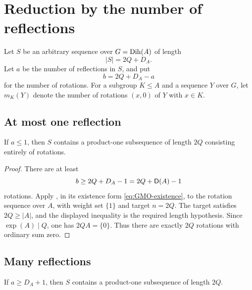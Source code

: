 \section{Reduction by the number of reflections}\label{sec:reflection-count}

Let \(S\) be an arbitrary sequence over \(G=\operatorname{Dih}(A)\) of length
\begin{equation}\label{eq:ambient-length}
  |S|=2Q+D_A.
\end{equation}
Let \(a\) be the number of reflections in \(S\), and put
\[
  b=2Q+D_A-a
\]
for the number of rotations. For a subgroup \(K\le A\) and a sequence
\(Y\) over \(G\), let \(m_K(Y)\) denote the number of rotations
\((x,0)\) of \(Y\) with \(x\in K\).

\subsection{At most one reflection}

\begin{proposition}\label{prop:few-reflections}
If \(a\le1\), then \(S\) contains a product-one subsequence of length
\(2Q\) consisting entirely of rotations.
\end{proposition}

\begin{proof}
There are at least
\[
  b\ge 2Q+D_A-1=2Q+\mathsf D(A)-1
\]
rotations. Apply , in its existence form
\eqref{eq:GMO-existence}, to the rotation sequence over \(A\), with
weight set \(\{1\}\) and target \(n=2Q\). The target satisfies
\(2Q\ge |A|\), and the displayed inequality is the required length
hypothesis. Since \(\exp(A)\mid Q\), one has \(2QA=\{0\}\). Thus
there are exactly \(2Q\) rotations with ordinary sum zero.
\end{proof}

\subsection{Many reflections}

\begin{proposition}\label{prop:many-reflections}
If \(a\ge D_A+1\), then \(S\) contains a product-one subsequence of
length \(2Q\).
\end{proposition}


